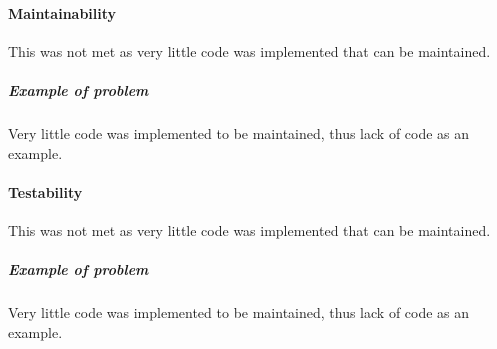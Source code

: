 
\paragraph{Maintainability}
	This was not met as very little code was implemented that can be maintained.
	\subparagraph{Example of problem}
		Very little code was implemented to be maintained, thus lack of code as an example.
		
	\paragraph{Testability}
	This was not met as very little code was implemented that can be maintained.
	\subparagraph{Example of problem}
		Very little code was implemented to be maintained, thus lack of code as an example.